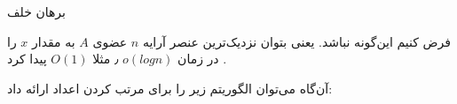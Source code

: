 \proof
برهان خلف

فرض کنیم این‌گونه نباشد. یعنی بتوان نزدیک‌ترین عنصر آرایه 
$n$
عضوی 
$A$
به مقدار 
$x$
را در زمان 
$o(logn)$
٫ مثلا 
$O(1)$
پیدا کرد
.

آن‌گاه می‌توان الگوریتم زیر را برای مرتب کردن اعداد ارائه داد:
